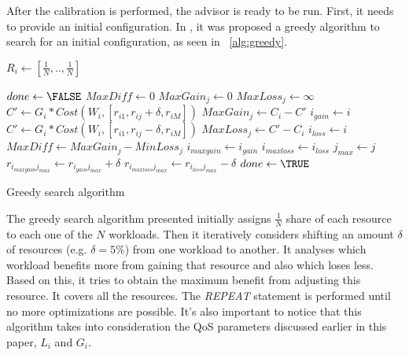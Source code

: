 After the calibration is performed, the advisor is ready to be run. First, it needs to provide an initial configuration. In \cite{Soror:2008:AVM:1376616.1376711}, it was proposed a greedy algorithm to search for an initial configuration, as seen in ~\ref{alg:greedy}.

\begin{algorithm}[H]
 \begin{algorithmic}
	\STATE $R_{i} \gets [\frac{1}{N},..,\frac{1}{N}]$
    \ENDFOR

   \STATE $done \gets \FALSE$
   \REPEAT
	\STATE $MaxDiff \gets 0$
	    \STATE $MaxGain_{j} \gets 0$
	    \STATE $MaxLoss_{j} \gets \infty$
		 \STATE $C' \gets G_{i} * Cost(W_{i},[r_{i1},  r_{ij} + \delta, r_{iM}])$ 
		     \STATE $MaxGain_{j} \gets C_{i} - C'$
		     \STATE $i_{gain} \gets i$
		 \ENDIF
		 \STATE $C' \gets G_{i} * Cost(W_{i},[r_{i1},  r_{ij} - \delta, r_{iM}])$ 
		     \STATE $MaxLoss_{j} \gets C' - C_{i}$
		     \STATE $i_{loss} \gets i$
		 \ENDIF
	    \ENDFOR
	    \STATE {}
		\STATE $MaxDiff \gets MaxGain_{j} - MinLoss_{j}$
		\STATE $i_{maxgain} \gets i_{gain}$
		\STATE $i_{maxloss} \gets i_{loss}$
		\STATE $j_{max} \gets j$
	    \ENDIF
	\ENDFOR
	    \STATE $r_{i_{maxgain}j_{max}} \gets r_{i_{gain}j_{max}} + \delta $
	    \STATE $r_{i_{maxloss}j_{max}} \gets r_{i_{loss}j_{max}} - \delta $
	\ELSE
	    \STATE $done \gets \TRUE$
	\ENDIF

 \end{algorithmic}
  \caption{Greedy search algorithm}
  \label{alg:greedy}
\end{algorithm}
The greedy search algorithm presented initially assigns $\frac{1}{N}$ share of each resource to each one of the $N$ workloads. Then it iteratively considers shifting an amount $\delta$ of resources (e.g. $\delta = 5\%$) from one workload to another. It analyses which workload benefits more from gaining that resource and also which loses less. Based on this, it tries to obtain the maximum benefit from adjusting this resource. It covers all the resources. The \textit{REPEAT} statement is performed until no more optimizations are possible. It's also important to notice that this algorithm takes into consideration the QoS parameters discussed earlier in this paper, $L_{i}$ and $G_{i}$.

